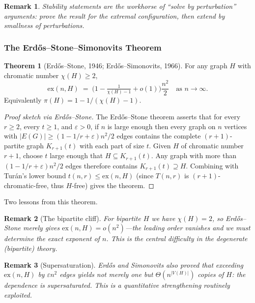 \documentclass{article}
\newtheorem{remark}{Remark}
\theoremstyle{definition}
\newtheorem{theorem}{Theorem}
\begin{document}
\begin{remark}
Stability statements are the workhorse of ``solve by perturbation''
arguments: prove the result for the extremal configuration, then
extend by smallness of perturbations.
\end{remark}

\subsubsection{The Erd\H{o}s--Stone--Simonovits Theorem}

\begin{theorem}[Erd\H{o}s--Stone, 1946; Erd\H{o}s--Simonovits, 1966]
For any graph $H$ with chromatic number $\chi(H) \ge 2$,
\[
  \mathrm{ex}(n, H) \;=\; \Big(1 - \tfrac{1}{\chi(H) - 1} + o(1)\Big)\frac{n^2}{2}
  \quad\text{as } n \to \infty.
\]
Equivalently $\pi(H) = 1 - 1/(\chi(H) - 1)$.
\end{theorem}

\begin{proof}[Proof sketch via Erd\H{o}s--Stone]
The Erd\H{o}s--Stone theorem asserts that for every $r \ge 2$, every
$t \ge 1$, and $\varepsilon > 0$, if $n$ is large enough then every graph
on $n$ vertices with $|E(G)| \ge (1 - 1/r + \varepsilon) n^2/2$ edges
contains the complete $(r+1)$-partite graph $K_{r+1}(t)$ with each
part of size $t$. Given $H$ of chromatic number $r + 1$, choose $t$
large enough that $H \subseteq K_{r+1}(t)$. Any graph with more than
$(1 - 1/r + \varepsilon) n^2/2$ edges therefore contains $K_{r+1}(t) \supseteq H$.
Combining with Tur\'an's lower bound $t(n, r) \le \mathrm{ex}(n, H)$
(since $T(n, r)$ is $(r+1)$-chromatic-free, thus $H$-free) gives the
theorem.
\end{proof}

Two lessons from this theorem.

\begin{remark}[The bipartite cliff]
For bipartite $H$ we have $\chi(H) = 2$, so Erd\H{o}s--Stone merely
gives $\mathrm{ex}(n, H) = o(n^2)$---the leading order vanishes and we
must determine the exact exponent of $n$. This is the central
difficulty in the \emph{degenerate} (bipartite) theory.
\end{remark}

\begin{remark}[Supersaturation]
Erd\H{o}s and Simonovits also proved that exceeding $\mathrm{ex}(n, H)$
by $\varepsilon n^2$ edges yields not merely one but $\Theta(n^{|V(H)|})$
copies of $H$: the dependence is \emph{supersaturated}. This is a
quantitative strengthening routinely exploited.
\end{remark}
\end{document}
